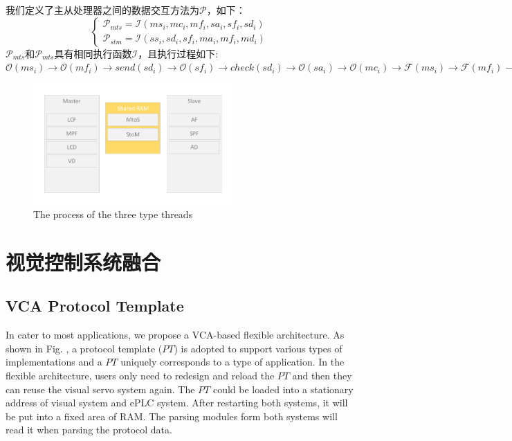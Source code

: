\documentclass[journal,UTF8]{IEEEtran}
\begin{document}
 我们定义了主从处理器之间的数据交互方法为$\mathcal{P}$，如下：
\begin{equation}
\left\{
\begin{array}{l}
\mathcal{P}_{mts} =\mathcal{I} (ms_i,mc_i,mf_i,sa_i,sf_i,sd_i)\\
\mathcal{P}_{stm} =\mathcal{I} (ss_i,sd_i,sf_i,ma_i,mf_i,md_i)
\end{array}
\right.
\end{equation}
$\mathcal{P}_{mts}$和$\mathcal{P}_{mts}$具有相同执行函数$\mathcal{I}$，且执行过程如下:
$\mathcal{O}(ms_i)\to\mathcal{O}(mf_i)\to send(sd_i)\to\mathcal{O}(sf_i)\to check(sd_i)\to\mathcal{O}(sa_i)\to\mathcal{O}(mc_i)\to\mathcal{F}(ms_i)\to\mathcal{F}(mf_i)\to\mathcal{F}(mc_i)\to\mathcal{F}(sf_i)\to\mathcal{F}(sa_i)$
\begin{figure}
	\centering
	\includegraphics[width=3in]{fig/RAM.pdf}
	\caption{ The process of the three type threads}
	\label{fig:RAM}
\end{figure}

\section{视觉控制系统融合}
\label{Integration}

\subsection{VCA Protocol Template}
In cater to most applications, we propose a VCA-based flexible architecture. As shown in Fig. , a protocol template ($PT$) is adopted to support various types of implementations and a $PT$ uniquely corresponds to a type of application. In the flexible architecture, users only need to redesign and reload the $PT$ and then they can reuse the visual servo system again. The $PT$ could be loaded into a stationary address of visual system and ePLC system. After restarting both systems, it will be put into a fixed area of RAM. The parsing modules form both systems will read it when parsing the protocol data.
 
\end{document}
